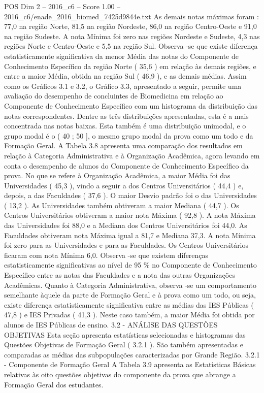 \begin{textsample}{POS Dim 2 – 2016\_c6 – Score 1.00 – 2016\_c6/enade\_2016\_biomed\_7425d9844e.txt}
As demais notas máximas foram : 77,0 na região Norte, 81,5 na região Nordeste, 86,0 na região Centro-Oeste e 91,0 na região Sudeste.
A nota Mínima foi zero nas regiões Nordeste e Sudeste, 4,3 nas regiões Norte e Centro-Oeste e 5,5 na região Sul.
Observa -se que existe diferença estatisticamente significativa da menor Média das notas do Componente de Conhecimento Específico da região Norte ( 35,6 ) em relação às demais regiões, e entre a maior Média, obtida na região Sul ( 46,9 ), e as demais médias.
Assim como os Gráficos 3.1 e 3.2, o Gráfico 3.3, apresentado a seguir, permite uma avaliação do desempenho de concluintes de Biomedicina em relação ao Componente de Conhecimento Específico com um histograma da distribuição das notas correspondentes.
Dentre as três distribuições apresentadas, esta é a mais concentrada nas notas baixas.
Esta também é uma distribuição unimodal, e o grupo modal é o ( 40 ; 50 ], o mesmo grupo modal da prova como um todo e da Formação Geral.
A Tabela 3.8 apresenta uma comparação dos resultados em relação à Categoria Administrativa e à Organização Acadêmica, agora levando em conta o desempenho de alunos do Componente de Conhecimento Específico da prova.
No que se refere à Organização Acadêmica, a maior Média foi das Universidades ( 45,3 ), vindo a seguir a dos Centros Universitários ( 44,4 ) e, depois, a das Faculdades ( 37,6 ).
O maior Desvio padrão foi o das Universidades ( 13,2 ).
As Universidades também obtiveram a maior Mediana ( 44,7 ).
Os Centros Universitários obtiveram a maior nota Máxima ( 92,8 ).
A nota Máxima das Universidades foi 88,0 e a Mediana dos Centros Universitários foi 44,0.
As Faculdades obtiveram nota Máxima igual a 81,7 e Mediana 37,3.
A nota Mínima foi zero para as Universidades e para as Faculdades.
Os Centros Universitários ficaram com nota Mínima 6,0.
Observa -se que existem diferenças estatisticamente significativas ao nível de 95 \% no Componente de Conhecimento Específico entre as notas das Faculdades e a nota das outras Organizações Acadêmicas.
Quanto à Categoria Administrativa, observa -se um comportamento semelhante àquele da parte de Formação Geral e à prova como um todo, ou seja, existe diferença estatisticamente significativa entre as médias das IES Públicas ( 47,8 ) e IES Privadas ( 41,3 ).
Neste caso também, a maior Média foi obtida por alunos de IES Públicas de ensino. 3.2 - ANÁLISE DAS QUESTÕES OBJETIVAS Esta seção apresenta estatísticas selecionadas e histogramas das Questões Objetivas de Formação Geral ( 3.2.1 ).
São também apresentadas e comparadas as médias das subpopulações caracterizadas por Grande Região. 3.2.1 - Componente de Formação Geral A Tabela 3.9 apresenta as Estatísticas Básicas relativas às oito questões objetivas do componente da prova que abrange a Formação Geral dos estudantes.

\end{textsample}
